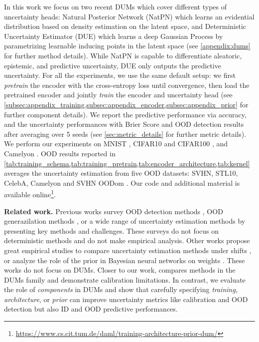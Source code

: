 In this work we focus on two recent DUMs which cover different types of uncertainty heads: Natural Posterior Network (NatPN) \cite{NatPN2021} which learns an evidential distribution based on density estimation on the latent space, and Deterministic Uncertainty Estimator (DUE) \citep{due} which learns a deep Gaussian Process by parametrizing learnable inducing points in the latent space (see \cref{appendix:dums} for further method details). While NatPN is capable to differentiate aleatoric, epistemic, and predictive uncertainty, DUE only outputs the predictive uncertainty. 
For all the experiments, we use the same default setup: we first \emph{pretrain} the encoder with the cross-entropy loss until convergence, then load the pretrained encoder and jointly \emph{train} the encoder and uncertainty head (see \cref{subsec:appendix_training,subsec:appendix_encoder,subsec:appendix_prior} for further component details). We report the predictive performance via accuracy, and the uncertainty performances with Brier Score and OOD detection results after averaging over 5 seeds (see \cref{sec:metric_details} for further metric details). We perform our experiments on MNIST \citep{mnist}, CIFAR10 and CIFAR100 \citep{cifar10}, and Camelyon \citep{wilds}. OOD results reported in 
\cref{tab:training_schema,tab:training_pretrain,tab:encoder_architecture,tab:kernel} averages the uncertainty estimation from five OOD datasets: SVHN, STL10, CelebA, Camelyon and SVHN OODom \citep{svhn, coates2011stl10, celeba}. Our code and additional material is available online\footnote{\url{https://www.cs.cit.tum.de/daml/training-architecture-prior-dum/}}.

\textbf{Related work.} Previous works survey OOD detection methods \citep{ood-detection-survey}, OOD generazilation methods \citep{ood-generalization-survey}, or a wide range of uncertainty estimation methods \citep{uncertainty-survey,psaros2023uncertainty,survey_evidential_uncertainty,review-uncertainty-dl} by presenting key methods and challenges. These surveys do not focus on deterministic methods and do not make empirical analysis.
Other works propose great empirical studies to compare uncertainty estimation methods under shifts \citep{dataset-shift}, or analyze the role of the prior in Bayesian neural networks on weights \citep{bayesposterior2020wenzel, fortuin2022prior, noci2021prior_cpe, kapoor2022prior_cpe}. These works do not focus on DUMs. Closer to our work, \citet{postels2022practicalitydum} compares methods in the DUMs family and demonstrate calibration limitations. In contrast, we evaluate the role of \emph{components} in DUMs and show that carefully specifying \emph{training}, \emph{architecture}, or \emph{prior} can improve uncertainty metrics like calibration and OOD detection but also ID and OOD predictive performances.

